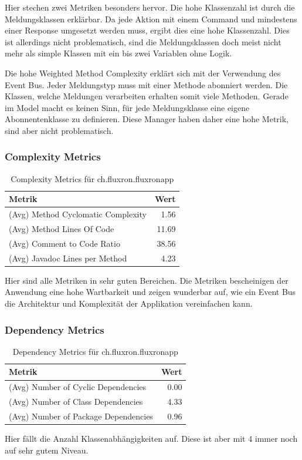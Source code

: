 Hier stechen zwei Metriken besonders hervor. Die hohe Klassenzahl ist durch die Meldungsklassen erklärbar. Da jede Aktion mit einem Command und mindestens einer Response umgesetzt werden muss, ergibt dies eine hohe Klassenzahl. Dies ist allerdings nicht problematisch, sind die Meldungsklassen doch meist nicht mehr als simple Klassen mit ein bis zwei Variablen ohne Logik.

Die hohe Weighted Method Complexity erklärt sich mit der Verwendung des Event Bus. Jeder Meldungstyp muss mit einer Methode abonniert werden. Die Klassen, welche Meldungen verarbeiten erhalten somit viele Methoden. Gerade im Model macht es keinen Sinn, für jede Meldungsklasse eine eigene Abonnentenklasse zu definieren. Diese Manager haben daher eine hohe Metrik, sind aber nicht problematisch.

\subsubsection{Complexity Metrics}

\begin{table}[H]
	\begin{center}
	  \begin{tabular}{ | l | r | }
	    \hline
	    \textbf{Metrik} & \textbf{Wert} \\ \hline
	    (Avg) Method Cyclomatic Complexity & 1.56 \\ \hline
  	    (Avg) Method Lines Of Code & 11.69 \\ \hline
  	    (Avg) Comment to Code Ratio & 38.56 \\ \hline
  	    (Avg) Javadoc Lines per Method & 4.23 \\ \hline
	  \end{tabular}
	  \caption{Complexity Metrics für ch.fluxron.fluxronapp}
  \end{center}
\end{table}

Hier sind alle Metriken in sehr guten Bereichen. Die Metriken bescheinigen der Anwendung eine hohe Wartbarkeit und zeigen wunderbar auf, wie ein Event Bus die Architektur und Komplexität der Applikation vereinfachen kann.

\subsubsection{Dependency Metrics}

\begin{table}[H]
	\begin{center}
	  \begin{tabular}{ | l | r | }
	    \hline
	    \textbf{Metrik} & \textbf{Wert} \\ \hline
	    (Avg) Number of Cyclic Dependencies & 0.00 \\ \hline
  	    (Avg) Number of Class Dependencies & 4.33 \\ \hline
  	    (Avg) Number of Package Dependencies & 0.96 \\ \hline
	  \end{tabular}
	  \caption{Dependency Metrics für ch.fluxron.fluxronapp}
  \end{center}
\end{table}

Hier fällt die Anzahl Klassenabhängigkeiten auf. Diese ist aber mit 4 immer noch auf sehr gutem Niveau.

\pagebreak